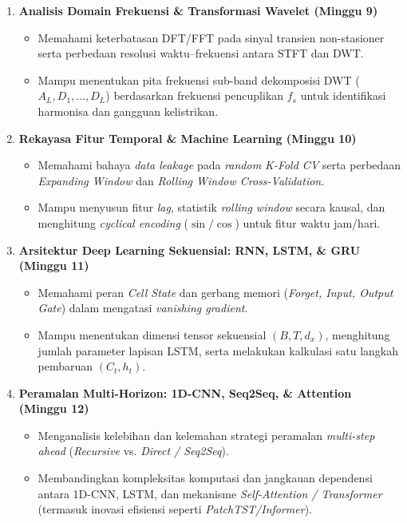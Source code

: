 \documentclass[11pt,a4paper]{article}
\begin{document}
\vspace{0.2cm}
\begin{enumerate}[label=\textbf{\arabic*.}, leftmargin=1.5em, itemsep=7pt]
    \item \textbf{Analisis Domain Frekuensi \& Transformasi Wavelet (Minggu 9)}
    \begin{itemize}[label=$\circ$]
        \item Memahami keterbatasan DFT/FFT pada sinyal transien non-stasioner serta perbedaan resolusi waktu--frekuensi antara STFT dan DWT.
        \item Mampu menentukan pita frekuensi sub-band dekomposisi DWT ($A_L, D_1, \dots, D_L$) berdasarkan frekuensi pencuplikan $f_s$ untuk identifikasi harmonisa dan gangguan kelistrikan.
    \end{itemize}

    \item \textbf{Rekayasa Fitur Temporal \& Machine Learning (Minggu 10)}
    \begin{itemize}[label=$\circ$]
        \item Memahami bahaya \textit{data leakage} pada \textit{random K-Fold CV} serta perbedaan \textit{Expanding Window} dan \textit{Rolling Window Cross-Validation}.
        \item Mampu menyusun fitur \textit{lag}, statistik \textit{rolling window} secara kausal, dan menghitung \textit{cyclical encoding} ($\sin/\cos$) untuk fitur waktu jam/hari.
    \end{itemize}

    \item \textbf{Arsitektur Deep Learning Sekuensial: RNN, LSTM, \& GRU (Minggu 11)}
    \begin{itemize}[label=$\circ$]
        \item Memahami peran \textit{Cell State} dan gerbang memori (\textit{Forget, Input, Output Gate}) dalam mengatasi \textit{vanishing gradient}.
        \item Mampu menentukan dimensi tensor sekuensial $(B, T, d_x)$, menghitung jumlah parameter lapisan LSTM, serta melakukan kalkulasi satu langkah pembaruan $(C_t, h_t)$.
    \end{itemize}

    \item \textbf{Peramalan Multi-Horizon: 1D-CNN, Seq2Seq, \& Attention (Minggu 12)}
    \begin{itemize}[label=$\circ$]
        \item Menganalisis kelebihan dan kelemahan strategi peramalan \textit{multi-step ahead} (\textit{Recursive} vs. \textit{Direct / Seq2Seq}).
        \item Membandingkan kompleksitas komputasi dan jangkauan dependensi antara 1D-CNN, LSTM, dan mekanisme \textit{Self-Attention / Transformer} (termasuk inovasi efisiensi seperti \textit{PatchTST/Informer}).
    \end{itemize}


\end{enumerate}
\end{document}
